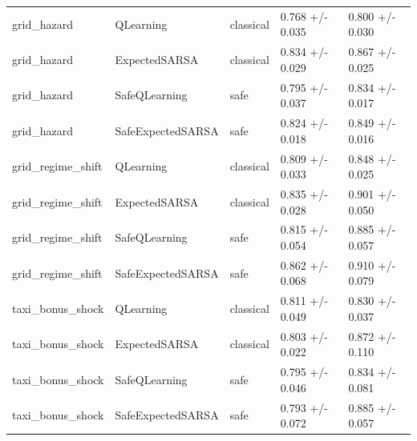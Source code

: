 \begin{tabular}{lllll}
grid_hazard & QLearning & classical & 0.768 +/- 0.035 & 0.800 +/- 0.030 \\
grid_hazard & ExpectedSARSA & classical & 0.834 +/- 0.029 & 0.867 +/- 0.025 \\
grid_hazard & SafeQLearning & safe & 0.795 +/- 0.037 & 0.834 +/- 0.017 \\
grid_hazard & SafeExpectedSARSA & safe & 0.824 +/- 0.018 & 0.849 +/- 0.016 \\
grid_regime_shift & QLearning & classical & 0.809 +/- 0.033 & 0.848 +/- 0.025 \\
grid_regime_shift & ExpectedSARSA & classical & 0.835 +/- 0.028 & 0.901 +/- 0.050 \\
grid_regime_shift & SafeQLearning & safe & 0.815 +/- 0.054 & 0.885 +/- 0.057 \\
grid_regime_shift & SafeExpectedSARSA & safe & 0.862 +/- 0.068 & 0.910 +/- 0.079 \\
taxi_bonus_shock & QLearning & classical & 0.811 +/- 0.049 & 0.830 +/- 0.037 \\
taxi_bonus_shock & ExpectedSARSA & classical & 0.803 +/- 0.022 & 0.872 +/- 0.110 \\
taxi_bonus_shock & SafeQLearning & safe & 0.795 +/- 0.046 & 0.834 +/- 0.081 \\
taxi_bonus_shock & SafeExpectedSARSA & safe & 0.793 +/- 0.072 & 0.885 +/- 0.057 \\
\bottomrule
\end{tabular}
